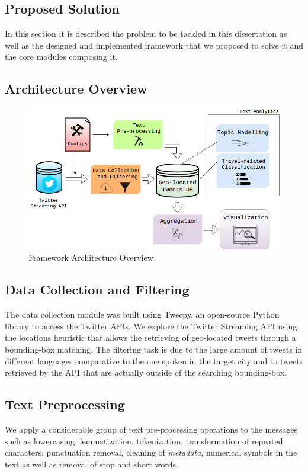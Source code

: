 \documentclass[9pt,a4paper]{extarticle}
\begin{document}
\begin{multicols}{2}
\section{Proposed Solution}\label{sec:work}

In this section it is described the problem to be tackled in this dissertation as well as the designed and implemented framework that we proposed to solve it and the core modules composing it.

\subsection{Architecture Overview}

\begin{figure}[H]
\centerline{\includegraphics[scale=.25]{architecture.png}}
\caption{Framework Architecture Overview}  
\label{fig:figura}
\end{figure}

\subsection{Data Collection and Filtering}
The data collection module was built using Tweepy, an open-source Python library to access the Twitter APIs. We explore the Twitter Streaming API using the locations heuristic that allows the retrieving of geo-located tweets through a bounding-box matching. The filtering task is due to the large amount of tweets in different languages comparative to the one spoken in the target city and to tweets retrieved by the API that are actually outside of the searching bounding-box.

\subsection{Text Preprocessing}
We apply a considerable group of text pre-processing operations to the messages such as lowercasing, lemmatization, tokenization, transformation of repeated characters, punctuation removal, cleaning of \textit{metadata}, numerical symbols in the text as well as removal of stop and short words.


\end{multicols}
\end{document}
